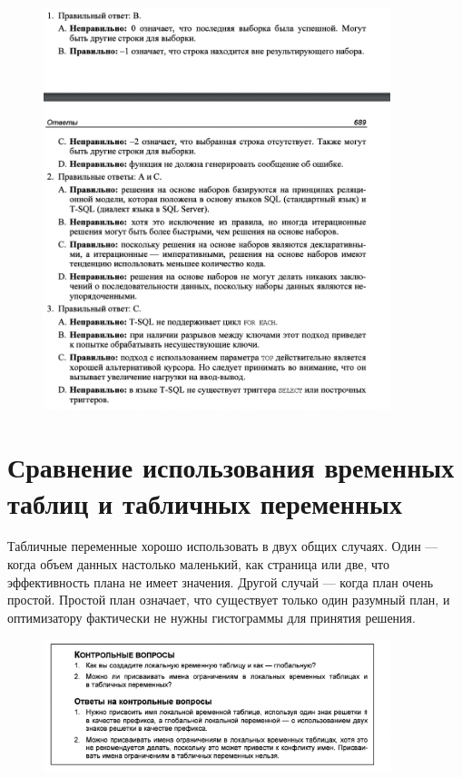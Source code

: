 \begin{figure}[h!]
	\begin{center}
		\includegraphics[width=0.9\textwidth]{img/ans46.png}
	\end{center}
	\captionsetup{justification=centering}
\end{figure}
\clearpage



\section{Сравнение использования временных таблиц и табличных переменных }

Табличные
переменные хорошо использовать в двух общих случаях. Один — когда объем данных настолько маленький, как страница или две, что эффективность плана
не имеет значения. Другой случай — когда план очень простой. Простой
план означает, что существует только один разумный план, и оптимизатору фактически не нужны гистограммы для принятия решения.

\begin{figure}[h!]
	\begin{center}
		\includegraphics[width=0.9\textwidth]{img/control45.png}
	\end{center}
	\captionsetup{justification=centering}
\end{figure}


